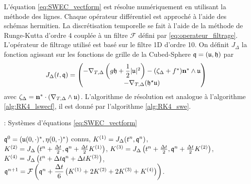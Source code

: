 L'équation \eqref{eq:SWEC_vectform} est résolue numériquement en utilisant la méthode des lignes. Chaque opérateur différentiel est approché à l'aide des schémas hermitien. La discrétisation temporelle se fait à l'aide de la méthode de Runge-Kutta d'ordre 4 couplée à un filtre $\mathcal{F}$ défini par \eqref{eq:operateur_filtrage}. L'opérateur de filtrage utilisé est basé sur le filtre 1D d'ordre 10.
On définit $J_{\Delta}$ la fonction agissant sur les fonctions de grille de la Cubed-Sphere $\mathfrak{q} = (\mathfrak{u},\mathfrak{h})$ par
\begin{equation}
J_{\Delta}(t,\mathfrak{q}) = \begin{pmatrix}
- \nabla_{T,\Delta} \left( g\mathfrak{h} + \dfrac{1}{2} |\mathfrak{u}|^2 \right) - (\zeta_{\Delta} + f^*) \mathbf{n}^* \wedge \mathfrak{u} \\
- \nabla_{T,\Delta} (\mathfrak{h}^{\star} \mathfrak{u})
\end{pmatrix}
\end{equation}
avec $\zeta_{\Delta} = \mathbf{n}^* \cdot (\nabla_{T,\Delta} \wedge \mathfrak{u})$. L'algorithme de résolution est analogue à l'algorithme \ref{alg:RK4_lswecf}, il est donné par l'algorithme \ref{alg:RK4_swe}.

\begin{center}
\begin{minipage}[H]{12cm}
  \begin{algorithm}[H]
    \caption{: Systèmes d'équations \eqref{eq:SWEC_vectform} }\label{alg:RK4_swe}
    \begin{algorithmic}[1]
    \State $\mathfrak{q}^0 = (\mathfrak{u}(0,\cdot)^* , \mathbf{\eta}(0,\cdot)^*)$ connu,
             \State  $K^{(1)} = J_{\Delta}(t^n, \mathfrak{q}^n)$,
             \State  $K^{(2)} = J_{\Delta}\left(t^n + \frac{\Delta t}{2}, \mathfrak{q}^n + \frac{\Delta t}{2} K^{(1)} \right)$,
             \State  $K^{(3)} = J_{\Delta}\left(t^n + \frac{\Delta t}{2}, \mathfrak{q}^n + \frac{\Delta t}{2} K^{(2)} \right)$,
             \State  $K^{(4)} = J_{\Delta}\left(t^n + \Delta t \mathfrak{q}^n + \Delta t K^{(3)} \right)$,  
             \State  $\mathfrak{q}^{n+1} = \mathcal{F}\left( \mathfrak{q}^n  + \dfrac{\Delta t}{6} \left( K^{(1)} + 2 K^{(2)} + 2 K^{(3)} + K^{(4)} \right) \right)$.
            \EndFor
    \end{algorithmic}
    \end{algorithm}
\end{minipage}
\end{center} 

